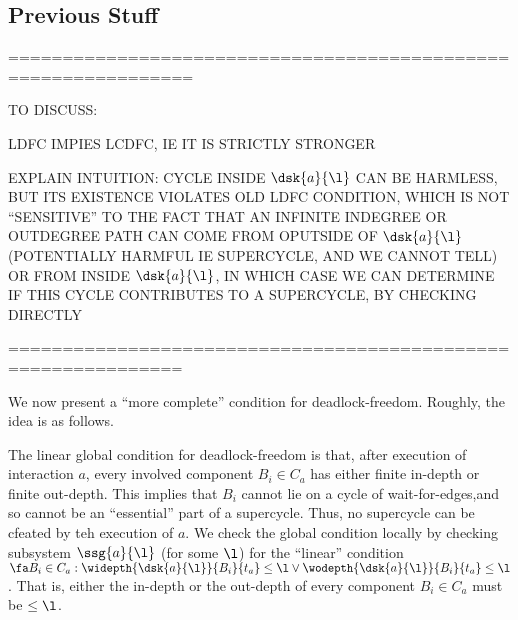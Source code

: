 
\subsection{Previous Stuff}

===============================================================

TO DISCUSS:

LDFC IMPIES LCDFC, IE IT IS STRICTLY STRONGER

EXPLAIN INTUITION: CYCLE INSIDE $\dsk{a}{\l}$ CAN BE HARMLESS, BUT ITS
EXISTENCE VIOLATES OLD LDFC CONDITION, WHICH IS NOT ``SENSITIVE'' TO
THE FACT THAT AN INFINITE INDEGREE OR OUTDEGREE PATH CAN COME FROM
OPUTSIDE OF $\dsk{a}{\l}$ (POTENTIALLY HARMFUL IE SUPERCYCLE, AND WE CANNOT
TELL) OR FROM INSIDE $\dsk{a}{\l}$, IN WHICH CASE WE CAN DETERMINE IF THIS
CYCLE CONTRIBUTES TO A SUPERCYCLE, BY CHECKING DIRECTLY



==============================================================

We now present a ``more complete'' condition for deadlock-freedom.
Roughly, the idea is as follows. 

The linear global condition for deadlock-freedom is that, after execution of interaction $a$, every involved component
$B_i \in C_a$ has either finite in-depth or finite out-depth.  This implies that $B_i$ cannot lie on a
cycle of wait-for-edges,and so cannot be an ``essential'' part of a supercycle.
Thus, no supercycle can be cfeated by teh execution of $a$.
We check the global condition locally by checking subsystem $\ssg{a}{\l}$ (for some $\l$) for
the ``linear'' condition 
$ \fa B_i \in C_a: \widepth{\dsk{a}{\l}}{B_i}{t_a} \le \l \lor \wodepth{\dsk{a}{\l}}{B_i}{t_a} \le \l$.
That is, either the in-depth or the out-depth of every component
$B_i \in C_a$ must be $\le \l$.

